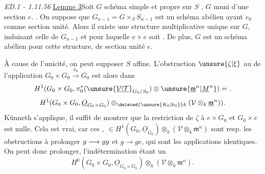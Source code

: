 \hfill\textit{ED.1 - 1.11.56}
\uline{Lemme 3}\quad Soit $G$ schéma simple et propre sur $S$  , $G$ muni d'une section $e$.  . On suppose que $G_{n-1}=G\times_S S_{n-1}$ est un schéma abélien ayant $e_0$ comme section unité.  Alors il existe une structure multiplicative unique sur $G$, induisant celle de $G_{n-1}$ et pour laquelle $e\times e$ soit . De plus, $G$ est un schéma abélien pour cette structure, de section unité $e$.

 À cause de l'unicité, on peut supposer $S$  affine. L'obstruction $\unsure{\zeta|\xi}$ au  de l'application $G_0\times G_0\xrightarrow{\pi_0}G_0$ est alors dans
\[
 H^1(G_0\times G_0,\pi_0^*(\unsure{\underline{\mathcal V}|\underline{\mathcal T}}_{G_0/S_0})\otimes\unsure{\underline{\mathfrak m}^{n}|\underline{M}^{n}})=.
\]
\[
H^1(G_0\times G_0,\underline O_{G_0\times G_0})\otimes_{\deleted{\unsure{K_0|k_0}}k}(\mathcal V\otimes_k\underline{\mathfrak m}^{n})).
\]
Künneth s'applique, il suffit de montrer que la restriction de $\zeta$ à $e\times G_0$ et $G_0\times e$ est nulle. Cela est vrai, car ces  $,\ \in H^1(G_0,\underline O_{G_0})\otimes_k(\mathcal V\otimes_k\mathfrak m^n)$ sont resp. les obstructions à prolonger $g\longrightarrow gg$ et $g\longrightarrow ge$, qui sont les applications identiques. On peut donc prolonger, l'indétermination étant un
\[
H^0(G_0\times G_0,\underline O_{G_0\times G_0})\otimes_k(\mathcal V\otimes_k\mathfrak m^n).
\]

